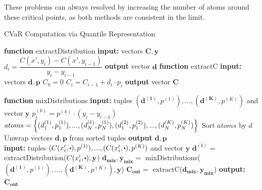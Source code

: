 These problems can always resolved by increasing the number of atoms around these critical points, as both methods are consistent in the limit.


\begin{algorithm}
\caption{CVaR Computation via Quantile Representation}
\begin{algorithmic}\label{alg:cvarvi}
\setlength{\columnseprule}{0.4pt}
\begin{multicols}{2}
\STATE \textbf{function} extractDistribution
\bindent
    \STATE \textbf{input:} vectors $\mathbf{C}, \mathbf{y}$
    \STATE {}
	\STATE $d_i = \dfrac{C(x', y_i)-C(x', y_{i-1})}{y_i-y_{i-1}}$
	\ENDFOR
	\STATE \textbf{output} vector $\mathbf{d}$
\eindent
\STATE \textbf{function} extractC
\bindent
    \STATE \textbf{input:} vectors $\mathbf{d}, \mathbf{p}$
    \STATE $C_0 = 0$
	\STATE $C_i = C_{i-1} + d_i \cdot p_i$
	\ENDFOR
	\STATE \textbf{output} vector $\mathbf{C}$
\eindent
\end{multicols}

\hrulefill

\STATE \textbf{function} mixDistributions
\bindent
    \STATE \textbf{input:} tuples $(\mathbf{d^{(1)}}, p^{(1)}),...,(\mathbf{d^{(K)}}, p^{(K)})$ and vector $\mathbf{y}$ 
    \STATE {}
    	\STATE {}
		\STATE $p^{(k)}_i = p^{(k)} \cdot (y_i - y_{i-1})$
	\ENDFOR
	\STATE {}
	\STATE $atoms = \left\{ {(d^{(1)}_1, p^{(1)}_1), ..., (d^{(1)}_N, p^{(1)}_N), (d^{(2)}_1, p^{(2)}_1), ..., (d^{(K)}_N, p^{(K)}_N)} \right\}$
	\STATE Sort $atoms$ by $d$
	\STATE Unwrap vectors $\mathbf{d}, \mathbf{p}$ from sorted tuples
	\STATE \textbf{output} $\mathbf{d}, \mathbf{p}$
\eindent
\\\hrulefill
\STATE {}
\STATE \textbf{input:} tuples $(C(x_i', \bigcdot), p^{(1)}),...,(C(x_i', \bigcdot), p^{(K)})$ and vector $\mathbf{y}$ 
\STATE $\mathbf{d^{(i)}}$ = extractDistribution($C(x_i', \bigcdot), \mathbf{y}$)
\ENDFOR
\STATE $\mathbf{d_{mix}}, \mathbf{y_{mix}} =$ mixDistributions($(\mathbf{d^{(1)}}, p^{(1)}),...,(\mathbf{d^{(K)}}, p^{(K)}), \mathbf{y}$)
\STATE $\mathbf{C_{out}} =$ extractC($\mathbf{d_{mix}}, \mathbf{y_{mix}}$)
\STATE \textbf{output:} $\mathbf{C_{out}}$
\end{algorithmic}

\end{algorithm}



